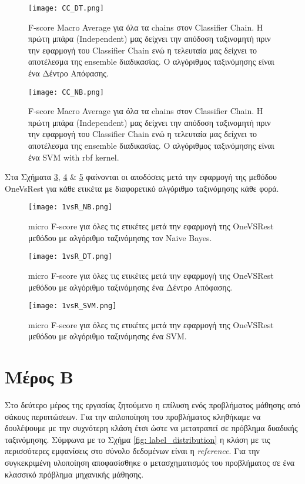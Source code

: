 \begin{figure}
	\texttt{[image: CC\_DT.png]}
	\caption{F-score Macro Average για όλα τα chains στον Classifier Chain. Η πρώτη μπάρα (Independent) μας δείχνει την απόδοση ταξινομητή πριν την εφαρμογή του Classifier Chain ενώ η τελευταία μας δείχνει το αποτέλεσμα της ensemble διαδικασίας. Ο αλγόριθμος ταξινόμησης είναι ένα Δέντρο Απόφασης.}
	\label{fig: CC_DT}
\end{figure}

\begin{figure}
	\texttt{[image: CC\_NB.png]}
	\caption{F-score Macro Average για όλα τα chains στον Classifier Chain. Η πρώτη μπάρα (Independent) μας δείχνει την απόδοση ταξινομητή πριν την εφαρμογή του Classifier Chain ενώ η τελευταία μας δείχνει το αποτέλεσμα της ensemble διαδικασίας. Ο αλγόριθμος ταξινόμησης είναι ένα SVM with rbf kernel.}
	\label{fig: CC_SVM}
\end{figure}


Στα Σχήματα \ref{fig: 1vsR_NB}, \ref{fig: 1vsR_DT} \& \ref{fig: 1vsR_SVM} φαίνονται οι αποδόσεις μετά την εφαρμογή της μεθόδου OneVsRest για κάθε ετικέτα με διαφορετικό αλγόριθμο ταξινόμησης κάθε φορά.


\begin{figure}
	\texttt{[image: 1vsR\_NB.png]}
	\caption{micro F-score  για όλες τις ετικέτες μετά την εφαρμογή της OneVSRest μεθόδου με αλγόριθμο ταξινόμησης τον Naive Bayes.}
	\label{fig: 1vsR_NB}
\end{figure}


\begin{figure}
	\texttt{[image: 1vsR\_DT.png]}
	\caption{micro F-score  για όλες τις ετικέτες μετά την εφαρμογή της OneVSRest μεθόδου με αλγόριθμο ταξινόμησης ένα Δέντρο Απόφασης.}
	\label{fig: 1vsR_DT}
\end{figure}


\begin{figure}
	\texttt{[image: 1vsR\_SVM.png]}
	\caption{micro F-score  για όλες τις ετικέτες μετά την εφαρμογή της OneVSRest μεθόδου με αλγόριθμο ταξινόμησης ένα SVM.}
	\label{fig: 1vsR_SVM}
\end{figure}
\newpage
\section{Μέρος Β}

Στο δεύτερο μέρος της εργασίας ζητούμενο η επίλυση ενός προβλήματος μάθησης από σάκους περιπτώσεων. Για την απλοποίηση του προβλήματος κληθήκαμε να δουλέψουμε με την συχνότερη κλάση έτσι ώστε να μετατραπεί σε πρόβλημα δυαδικής ταξινόμησης. Σύμφωνα με το Σχήμα \ref{fig: label_distribution} η κλάση με τις περισσότερες εμφανίσεις στο σύνολο δεδομένων είναι η \emph{reference}. Για την συγκεκριμένη υλοποίηση αποφασίσθηκε ο μετασχηματισμός του προβλήματος σε ένα κλασσικό πρόβλημα μηχανικής μάθησης. 


